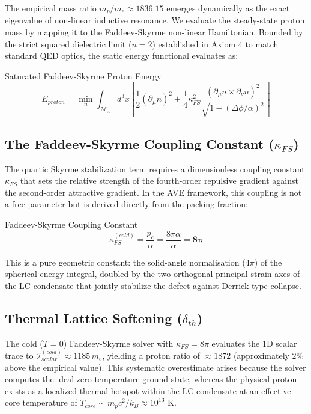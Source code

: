 The empirical mass ratio $m_p/m_e \approx 1836.15$ emerges dynamically as the exact eigenvalue of non-linear inductive resonance. We evaluate the steady-state proton mass by mapping it to the Faddeev-Skyrme non-linear Hamiltonian. Bounded by the strict squared dielectric limit ($n=2$) established in Axiom 4 to match standard QED optics, the static energy functional evaluates as:
\begin{resultbox}{Saturated Faddeev-Skyrme Proton Energy}
\begin{equation}
E_{proton} = \min_{n} \int_{\mathcal{M}_A} d^3x \left[ \frac{1}{2}(\partial_\mu n)^2 + \frac{1}{4}\kappa_{FS}^2 \frac{(\partial_\mu n \times \partial_\nu n)^2}{\sqrt{1 - (\Delta\phi / \alpha)^2}} \right]
\end{equation}
\end{resultbox}

\subsection{The Faddeev-Skyrme Coupling Constant ($\kappa_{FS}$)}

The quartic Skyrme stabilization term requires a dimensionless coupling constant $\kappa_{FS}$ that sets the relative strength of the fourth-order repulsive gradient against the second-order attractive gradient. In the AVE framework, this coupling is not a free parameter but is derived directly from the packing fraction:
\begin{resultbox}{Faddeev-Skyrme Coupling Constant}
\begin{equation}
\kappa_{FS}^{(cold)} = \frac{p_c}{\alpha} = \frac{8\pi\alpha}{\alpha} = \mathbf{8\pi}
\end{equation}
\end{resultbox}

This is a pure geometric constant: the solid-angle normalisation ($4\pi$) of the spherical energy integral, doubled by the two orthogonal principal strain axes of the LC condensate that jointly stabilize the defect against Derrick-type collapse.

\subsection{Thermal Lattice Softening ($\delta_{th}$)}
\label{sec:thermal_softening}

The cold ($T=0$) Faddeev-Skyrme solver with $\kappa_{FS} = 8\pi$ evaluates the 1D scalar trace to $\mathcal{I}_{scalar}^{(cold)} \approx 1185\,m_e$, yielding a proton ratio of $\approx 1872$ (approximately $2\%$ above the empirical value). This systematic overestimate arises because the solver computes the ideal zero-temperature ground state, whereas the physical proton exists as a localized thermal hotspot within the LC condensate at an effective core temperature of $T_{core} \sim m_p c^2/k_B \approx 10^{13}\text{ K}$.

